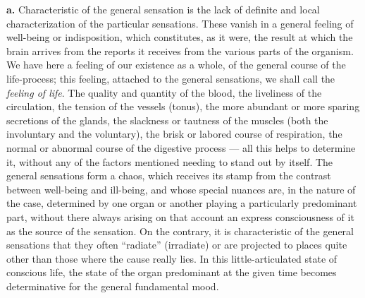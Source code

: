 \documentclass[12pt,a4paper]{book}
\begin{document}
\textbf{a.} Characteristic of the general sensation is the lack of
definite and local characterization of the particular sensations. These
vanish in a general feeling of well-being or indisposition, which
constitutes, as it were, the result at which the brain arrives from the
reports it receives from the various parts of the organism. We have here
a feeling of our existence as a whole, of the general course of the
life-process; this feeling, attached to the general sensations, we shall
call the \emph{feeling of life}. The quality and quantity of the blood,
the liveliness of the circulation, the tension of the vessels (tonus),
the more abundant or more sparing secretions of the glands, the
slackness or tautness of the muscles (both the involuntary and the
voluntary), the brisk or labored course of respiration, the normal or
abnormal course of the digestive process --- all this helps to
determine it, without any of the factors mentioned needing to stand out
by itself. The general sensations form a chaos, which receives its
stamp from the contrast between well-being and ill-being, and whose
special nuances are, in the nature of the case, determined by one organ
or another playing a particularly predominant part, without there always
arising on that account an express consciousness of it as the source of
the sensation. On the contrary, it is characteristic of the general
sensations that they often ``radiate'' (irradiate) or are projected to
places quite other than those where the cause really lies. In this
little-articulated state of conscious life, the state of the organ
predominant at the given time becomes determinative for the general
fundamental mood.
\end{document}
